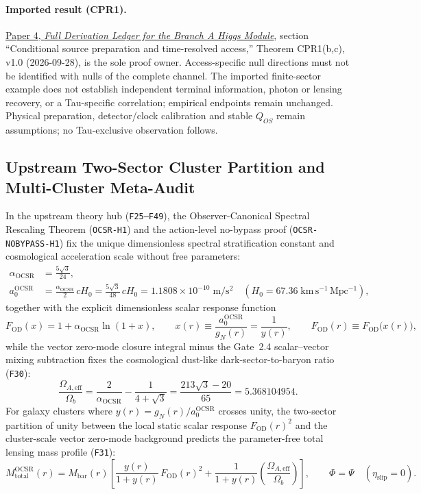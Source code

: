 \documentclass[11pt,a4paper]{article}
\begin{document}
\paragraph{Imported result (CPR1).}
\href{https://github.com/tau-core-research/tau-core-higgs-module-paper4/blob/main/paper4_full_derivation/full_derivation.pdf#nameddest=cpr1}{Paper 4, \emph{Full Derivation Ledger for the Branch A Higgs Module}}, section ``Conditional source preparation and time-resolved access,'' Theorem CPR1(b,c), v1.0 (2026-09-28), is the sole proof owner.
Access-specific null directions must not be identified with nulls of the complete channel. The imported finite-sector example does not establish independent terminal information, photon or lensing recovery, or a Tau-specific correlation; empirical endpoints remain unchanged.
Physical preparation, detector/clock calibration and stable $Q_{OS}$ remain assumptions; no Tau-exclusive observation follows.

\subsection{Upstream Two-Sector Cluster Partition and Multi-Cluster Meta-Audit}
\label{sec:upstream-two-sector-cluster-partition-20260929}

In the upstream theory hub (\texttt{F25--F49}), the Observer-Canonical Spectral Rescaling Theorem (\texttt{OCSR-H1}) and the action-level no-bypass proof (\texttt{OCSR-NOBYPASS-H1}) fix the unique dimensionless spectral stratification constant and cosmological acceleration scale without free parameters:
\begin{align*}
\alpha_{\mathrm{OCSR}} &= \frac{5\sqrt{3}}{24}, \\
a_0^{\mathrm{OCSR}} &= \frac{\alpha_{\mathrm{OCSR}}}{2}\,cH_0 = \frac{5\sqrt{3}}{48}\,cH_0 = 1.1808\times 10^{-10}\;\mathrm{m/s^2}
\quad (H_0=67.36\;\mathrm{km\,s^{-1}\,Mpc^{-1}}),
\end{align*}
together with the explicit dimensionless scalar response function
\[
F_{\mathrm{OD}}(x) = 1 + \alpha_{\mathrm{OCSR}}\ln(1+x),
\qquad
x(r) \equiv \frac{a_0^{\mathrm{OCSR}}}{g_N(r)} = \frac{1}{y(r)},
\qquad
F_{\mathrm{OD}}(r) \equiv F_{\mathrm{OD}}\!\bigl(x(r)\bigr),
\]
while the vector zero-mode closure integral minus the Gate~2.4 scalar--vector mixing subtraction fixes the cosmological dust-like dark-sector-to-baryon ratio (\texttt{F30}):
\[
\frac{\Omega_{A,\mathrm{eff}}}{\Omega_b}
= \frac{2}{\alpha_{\mathrm{OCSR}}} - \frac{1}{4+\sqrt{3}}
= \frac{213\sqrt{3}-20}{65}
= 5.368104954.
\]
For galaxy clusters where $y(r)=g_N(r)/a_0^{\mathrm{OCSR}}$ crosses unity, the two-sector partition of unity between the local static scalar response $F_{\mathrm{OD}}(r)^2$ and the cluster-scale vector zero-mode background predicts the parameter-free total lensing mass profile (\texttt{F31}):
\[
M_{\mathrm{total}}^{\mathrm{OCSR}}(r)
= M_{\mathrm{bar}}(r)\!\left[
\frac{y(r)}{1+y(r)}\,F_{\mathrm{OD}}(r)^2
+ \frac{1}{1+y(r)}\!\left(\frac{\Omega_{A,\mathrm{eff}}}{\Omega_b}\right)
\right],
\qquad
\Phi=\Psi\quad(\eta_{\mathrm{slip}}=0).
\]
\end{document}
